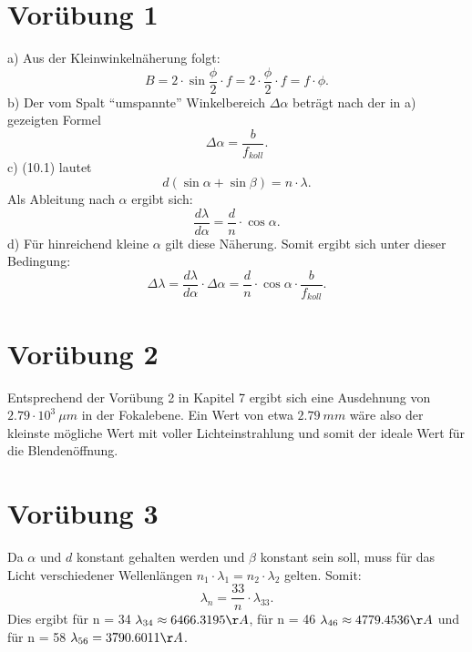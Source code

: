 \documentclass[titlepage]{scrartcl}
\begin{document}
\section{Vorübung 1}
a) Aus der Kleinwinkelnäherung folgt: 
\begin{equation}
B = 2\cdot \sin{\frac{\phi}{2}} \cdot f = 2 \cdot \frac{\phi}{2} \cdot f = f \cdot \phi.
\end{equation}
b) Der vom Spalt \enquote{umspannte} Winkelbereich $\Delta \alpha $ beträgt nach der in a) gezeigten Formel 
\begin{equation}
\Delta \alpha = \frac{b}{f_{koll}}.
\end{equation}
c) (10.1) lautet 
\begin{equation}
d(\sin \alpha  + \sin \beta) = n \cdot \lambda. 
\end{equation}
Als Ableitung nach $\alpha$ ergibt sich:
\begin{equation}
\frac{d\lambda}{d\alpha} = \frac{d}{n} \cdot \cos{\alpha}.
\end{equation}
d) Für hinreichend kleine $\alpha$ gilt diese Näherung. Somit ergibt sich unter dieser Bedingung:
\begin{equation}
\Delta \lambda = \frac{d\lambda}{d\alpha} \cdot \Delta \alpha = \frac{d}{n} \cdot \cos{\alpha} \cdot \frac{b}{f_{koll}}.
\end{equation} 
\section{Vorübung 2}
Entsprechend der Vorübung 2 in Kapitel 7 ergibt sich eine Ausdehnung von $2.79 \cdot 10^3\ \mu m$ in der Fokalebene. Ein Wert von etwa $2.79\ mm$ wäre also der kleinste mögliche Wert mit voller Lichteinstrahlung und somit der ideale Wert für die Blendenöffnung. 
\section{Vorübung 3}
Da $\alpha$ und $d$ konstant gehalten werden und $\beta$ konstant sein soll, muss für das Licht verschiedener Wellenlängen $n_1 \cdot \lambda_1 = n_2 \cdot \lambda_2$ gelten. 
Somit: 
\begin{equation}
\lambda_n = \frac{33}{n} \cdot \lambda_{33}.
\end{equation}
Dies ergibt für n = 34 $\lambda_{34} \approx 6466.3195 \AA$, für n = 46 $\lambda_{46} \approx 4779.4536 \AA$ und für n = 58 $\lambda_{56} = 3790.6011 \AA$.
\end{document}
